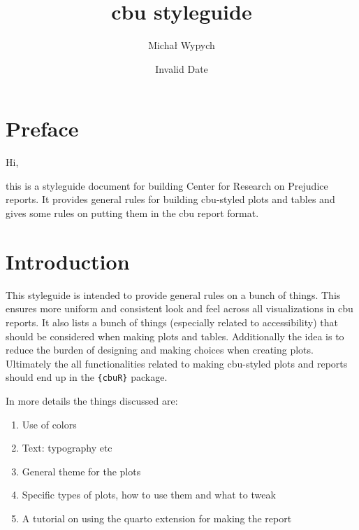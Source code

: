 \documentclass[
  letterpaper,
  DIV=11,
  numbers=noendperiod]{scrreprt}
\title{cbu styleguide}
\author{Michał Wypych}
\date{Invalid Date}
\providecommand{\tightlist}{%
  \setlength{\itemsep}{0pt}\setlength{\parskip}{0pt}}\usepackage{longtable,booktabs,array}
\renewcommand*\contentsname{Table of contents}
\newcommand\contentsname{Table of contents}
\begin{document}
\maketitle

\renewcommand*\contentsname{Table of contents}
{
\hypersetup{linkcolor=}
\setcounter{tocdepth}{2}
\tableofcontents
}


\chapter*{Preface}\label{preface}


Hi,

this is a styleguide document for building Center for Research on
Prejudice reports. It provides general rules for building cbu-styled
plots and tables and gives some rules on putting them in the cbu report
format.


\chapter{Introduction}\label{introduction}

This styleguide is intended to provide general rules on a bunch of
things. This ensures more uniform and consistent look and feel across
all visualizations in cbu reports. It also lists a bunch of things
(especially related to accessibility) that should be considered when
making plots and tables. Additionally the idea is to reduce the burden
of designing and making choices when creating plots. Ultimately the all
functionalities related to making cbu-styled plots and reports should
end up in the \texttt{\{cbuR\}} package.

In more details the things discussed are:

\begin{enumerate}
\def\labelenumi{\arabic{enumi}.}
\tightlist
\item
  Use of colors
\item
  Text: typography etc
\item
  General theme for the plots
\item
  Specific types of plots, how to use them and what to tweak
\item
  A tutorial on using the quarto extension for making the report
\end{enumerate}
\end{document}
